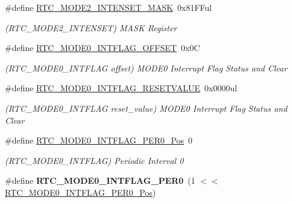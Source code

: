 \begin{DoxyCompactItemize}
\item 
\hypertarget{group___s_a_m_l21___r_t_c_ga9fa1d7355ebfb79ba256ef38c40b9ff6}{}\#define \hyperlink{group___s_a_m_l21___r_t_c_ga9fa1d7355ebfb79ba256ef38c40b9ff6}{R\+T\+C\+\_\+\+M\+O\+D\+E2\+\_\+\+I\+N\+T\+E\+N\+S\+E\+T\+\_\+\+M\+A\+S\+K}~0x81\+F\+Ful\label{group___s_a_m_l21___r_t_c_ga9fa1d7355ebfb79ba256ef38c40b9ff6}

\begin{DoxyCompactList}\small\item\em (R\+T\+C\+\_\+\+M\+O\+D\+E2\+\_\+\+I\+N\+T\+E\+N\+S\+E\+T) M\+A\+S\+K Register \end{DoxyCompactList}\item 
\hypertarget{group___s_a_m_l21___r_t_c_gad3aa7f615a991577a4deab1e8be2bf81}{}\#define \hyperlink{group___s_a_m_l21___r_t_c_gad3aa7f615a991577a4deab1e8be2bf81}{R\+T\+C\+\_\+\+M\+O\+D\+E0\+\_\+\+I\+N\+T\+F\+L\+A\+G\+\_\+\+O\+F\+F\+S\+E\+T}~0x0\+C\label{group___s_a_m_l21___r_t_c_gad3aa7f615a991577a4deab1e8be2bf81}

\begin{DoxyCompactList}\small\item\em (R\+T\+C\+\_\+\+M\+O\+D\+E0\+\_\+\+I\+N\+T\+F\+L\+A\+G offset) M\+O\+D\+E0 Interrupt Flag Status and Clear \end{DoxyCompactList}\item 
\hypertarget{group___s_a_m_l21___r_t_c_ga929361fd8ec24d3db79e1a77fd500741}{}\#define \hyperlink{group___s_a_m_l21___r_t_c_ga929361fd8ec24d3db79e1a77fd500741}{R\+T\+C\+\_\+\+M\+O\+D\+E0\+\_\+\+I\+N\+T\+F\+L\+A\+G\+\_\+\+R\+E\+S\+E\+T\+V\+A\+L\+U\+E}~0x0000ul\label{group___s_a_m_l21___r_t_c_ga929361fd8ec24d3db79e1a77fd500741}

\begin{DoxyCompactList}\small\item\em (R\+T\+C\+\_\+\+M\+O\+D\+E0\+\_\+\+I\+N\+T\+F\+L\+A\+G reset\+\_\+value) M\+O\+D\+E0 Interrupt Flag Status and Clear \end{DoxyCompactList}\item 
\hypertarget{group___s_a_m_l21___r_t_c_ga63436e280b796ffad94fb7702807099f}{}\#define \hyperlink{group___s_a_m_l21___r_t_c_ga63436e280b796ffad94fb7702807099f}{R\+T\+C\+\_\+\+M\+O\+D\+E0\+\_\+\+I\+N\+T\+F\+L\+A\+G\+\_\+\+P\+E\+R0\+\_\+\+Pos}~0\label{group___s_a_m_l21___r_t_c_ga63436e280b796ffad94fb7702807099f}

\begin{DoxyCompactList}\small\item\em (R\+T\+C\+\_\+\+M\+O\+D\+E0\+\_\+\+I\+N\+T\+F\+L\+A\+G) Periodic Interval 0 \end{DoxyCompactList}\item 
\hypertarget{group___s_a_m_l21___r_t_c_gaac8eec6d04bbf30335362208ffbd7afd}{}\#define {\bfseries R\+T\+C\+\_\+\+M\+O\+D\+E0\+\_\+\+I\+N\+T\+F\+L\+A\+G\+\_\+\+P\+E\+R0}~(1 $<$$<$ \hyperlink{group___s_a_m_l21___r_t_c_ga63436e280b796ffad94fb7702807099f}{R\+T\+C\+\_\+\+M\+O\+D\+E0\+\_\+\+I\+N\+T\+F\+L\+A\+G\+\_\+\+P\+E\+R0\+\_\+\+Pos})\label{group___s_a_m_l21___r_t_c_gaac8eec6d04bbf30335362208ffbd7afd}


\end{DoxyCompactItemize}
